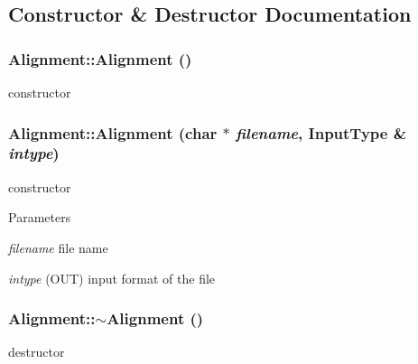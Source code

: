 \subsection{Constructor \& Destructor Documentation}
\hypertarget{classAlignment_a091e21f0cfb741cb5cdc3535c6cc287f}{
\subsubsection[{Alignment}]{\setlength{\rightskip}{0pt plus 5cm}Alignment::Alignment ()}}
\label{classAlignment_a091e21f0cfb741cb5cdc3535c6cc287f}
constructor \hypertarget{classAlignment_ad8ea66351921a99a02377e22062e54cb}{
\subsubsection[{Alignment}]{\setlength{\rightskip}{0pt plus 5cm}Alignment::Alignment (char $\ast$ {\em filename}, \/  InputType \& {\em intype})}}
\label{classAlignment_ad8ea66351921a99a02377e22062e54cb}
constructor 
\begin{DoxyParams}{Parameters}
\item[{\em filename}]file name \item[{\em intype}](OUT) input format of the file \end{DoxyParams}
\hypertarget{classAlignment_a8787573a5060136c2a51f40cf229e356}{
\subsubsection[{$\sim$Alignment}]{\setlength{\rightskip}{0pt plus 5cm}Alignment::$\sim$Alignment ()}}
\label{classAlignment_a8787573a5060136c2a51f40cf229e356}
destructor 

